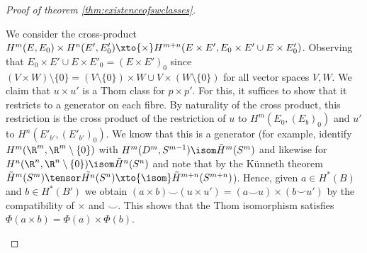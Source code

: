 \begin{proof}[Proof of theorem \ref{thm:existenceofswclasses}]
\begin{enumerate}
			We consider the cross-product $H^m(E, E_0) \times H^n(E', E'_0) \xto{\times} H^{m + n}(E \times E', E_0 \times E' \cup E \times E'_0)$.
			Observing that $E_0 \times E' \cup E \times E'_0 = (E \times E')_0$ since $(V \times W) \setminus \{0\} = (V \setminus \{0\}) \times W \cup V \times (W \setminus \{0\})$ for all vector spaces $V, W$.
			We claim that $u \times u'$ is a Thom class for $p \times p'$.
			For this, it suffices to show that it restricts to a generator on each fibre.
			By naturality of the cross product, this restriction is the cross product of the restriction of $u$ to $H^m(E_0, (E_b)_0)$ and $u'$ to $H^n(E'_{b'}, (E'_{b'})_0)$.
			We know that this is a generator (for example, identify $H^m(\R^m, \R^m \setminus \{0\})$ with $H^m(D^m, S^{m - 1}) \isom \tilde{H}^m(S^m)$ and likewise for $H^n(\R^n, \R^n \setminus \{0\}) \isom \tilde{H}^n(S^n)$ and note that by the Künneth theorem $\tilde{H}^m(S^m) \tensor \tilde{H^n}(S^n) \xto{\isom} \tilde{H}^{m + n}(S^{m + n})$).
			Hence, given $a \in H^*(B)$ and $b \in H^*(B')$ we obtain $(a \times b) \smile (u \times u') = (a \smile u) \times (b \smile u')$ by the compatibility of $\times$ and $\smile$.
			This shows that the Thom isomorphism satisfies $\Phi(a \times b) = \Phi(a) \times \Phi(b)$.


\end{enumerate}
\end{proof}
